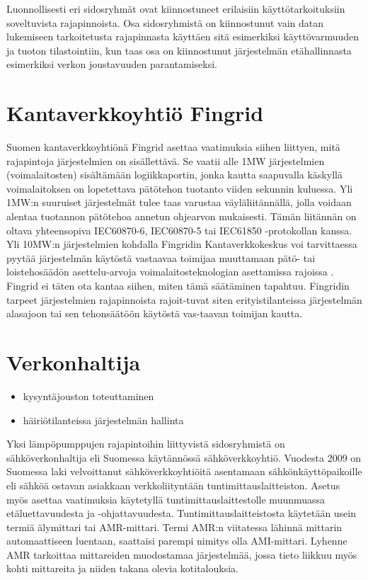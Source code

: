 Luonnollisesti eri sidosryhmät ovat kiinnostuneet erilaisiin käyttötarkoituksiin soveltuvista rajapinnoista. Osa sidosryhmistä on kiinnostunut vain datan lukemiseen tarkoitetusta rajapinnasta käyttäen sitä esimerkiksi käyttövarmuuden ja tuoton tilastointiin, kun taas osa on kiinnostunut järjestelmän etähallinnasta esimerkiksi verkon joustavuuden parantamiseksi.

\section{Kantaverkkoyhtiö Fingrid}
  Suomen kantaverkkoyhtiönä Fingrid asettaa vaatimuksia siihen liittyen, mitä rajapintoja järjestelmien on sisällettävä. Se vaatii alle 1MW järjestelmien (voimalaitosten) sisältämään logiikkaportin, jonka kautta saapuvalla käskyllä voimalaitoksen on lopetettava pätötehon tuotanto viiden sekunnin kuluessa. Yli 1MW:n suuruiset järjestelmät tulee taas varustaa väyläliitännällä, jolla voidaan alentaa tuotannon pätötehoa annetun ohjearvon mukaisesti. Tämän liitännän on oltava yhteensopiva IEC60870-6, IEC60870-5 tai IEC61850 -protokollan kanssa. \parencite{VJV2018}
  Yli 10MW:n järjestelmien kohdalla Fingridin Kantaverkkokeskus voi tarvittaessa pyytää järjestelmän käytöstä vastaavaa toimijaa muuttamaan pätö- tai loistehosäädön asettelu-arvoja voimalaitosteknologian asettamissa rajoissa \parencite{VJV2018}. Fingrid ei täten ota kantaa siihen, miten tämä säätäminen tapahtuu. Fingridin tarpeet järjestelmien rajapinnoista rajoit-tuvat siten erityistilanteissa järjestelmän alasajoon tai sen tehonsäätöön käytöstä vas-taavan toimijan kautta.

\section{Verkonhaltija}
  \begin{itemize}
    \item kysyntäjouston toteuttaminen
    \item häiriötilanteissa järjestelmän hallinta
  \end{itemize}

  Yksi lämpöpumppujen rajapintoihin liittyvistä sidosryhmistä on sähköverkonhaltija eli Suomessa käytännössä sähköverkkoyhtiö. Vuodesta 2009 on Suomessa laki velvoittanut sähköverkkoyhtiöitä asentamaan sähkönkäyttöpaikoille eli sähköä ostavan asiakkaan verkkoliityntään tuntimittauslaitteiston. Asetus myös asettaa vaatimuksia käytetyllä tuntimittauslaittestolle muunmuassa etäluettavuudesta ja -ohjattavuudesta.\parencite{mittariAsetus} Tuntimittauslaitteistosta käytetään usein termiä älymittari tai AMR-mittari. Termi AMR:n viitatessa lähinnä mittarin automaattiseen luentaan, saattaisi parempi nimitys olla AMI-mittari. Lyhenne AMR tarkoittaa mittareiden muodostamaa järjestelmää, jossa tieto liikkuu myös kohti mittareita ja niiden takana olevia kotitalouksia.\parencite{dictOfEnergy}

